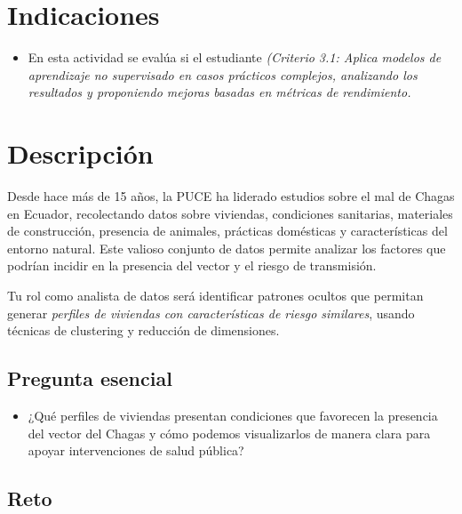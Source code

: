 \documentclass[a4,11pt]{aleph-notas}
\begin{document}
\encabezado

\section{Indicaciones}
\begin{itemize}[leftmargin=*]
\item 
    En esta actividad se evalúa si el estudiante \textit{(Criterio 3.1: Aplica modelos de aprendizaje no supervisado en casos prácticos complejos, analizando los resultados y proponiendo mejoras basadas en métricas de rendimiento.}
\end{itemize}


\section{Descripción}  

Desde hace más de 15 años, la PUCE ha liderado estudios sobre el mal de Chagas en Ecuador, recolectando datos sobre viviendas, condiciones sanitarias, materiales de construcción, presencia de animales, prácticas domésticas y características del entorno natural. Este valioso conjunto de datos permite analizar los factores que podrían incidir en la presencia del vector y el riesgo de transmisión.

Tu rol como analista de datos será identificar patrones ocultos que permitan generar \textit{perfiles de viviendas con características de riesgo similares}, usando técnicas de clustering y reducción de dimensiones.

\subsection*{Pregunta esencial}  
\begin{itemize}[leftmargin=*]
\item ¿Qué perfiles de viviendas presentan condiciones que favorecen la presencia del vector del Chagas y cómo podemos visualizarlos de manera clara para apoyar intervenciones de salud pública?
\end{itemize}

\subsection*{Reto}  
\end{document}
